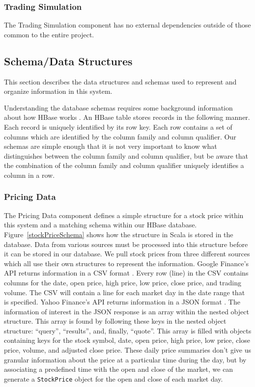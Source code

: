 \subsubsection{Trading Simulation}

The Trading Simulation component has no external dependencies outside of those common to the entire project.

\subsection{Schema/Data Structures}

This section describes the data structures and schemas used to represent and organize information in this system.

Understanding the database schemas requires some background information about how HBase works \cite{hbase}.
An HBase table stores records in the following manner.
Each record is uniquely identified by its row key.
Each row contains a set of columns which are identified by the column family and column qualifier.
Our schemas are simple enough that it is not very important to know what distinguishes between the column family and column qualifier, but be aware that the combination of the column family and column qualifier uniquely identifies a column in a row.

\subsubsection{Pricing Data}

The Pricing Data component defines a simple structure for a stock price within this system and a matching schema within our HBase database.
Figure~\ref{stockPriceSchema} shows how the structure in Scala is stored in the database.
Data from various sources must be processed into this structure before it can be stored in our database.
We pull stock prices from three different sources which all use their own structures to represent the information.
Google Finance's API returns information in a CSV format \cite{csv}.
Every row (line) in the CSV contains columns for the date, open price, high price, low price, close price, and trading volume.
The CSV will contain a line for each market day in the date range that is specified.
Yahoo Finance's API returns information in a JSON format \cite{json}.
The information of interest in the JSON response is an array within the nested object structure.
This array is found by following these keys in the nested object structure: ``query'', ``results'', and, finally, ``quote''.
This array is filled with objects containing keys for the stock symbol, date, open price, high price, low price, close price, volume, and adjusted close price.
These daily price summaries don't give us granular information about the price at a particular time during the day, but by associating a predefined time with the open and close of the market, we can generate a \texttt{StockPrice} object for the open and close of each market day.

